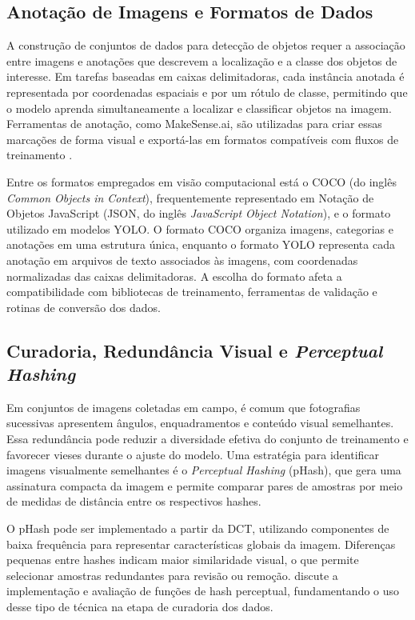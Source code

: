 \documentclass[artigo,times,capa]{iftex2024}
\begin{document}
\subsection{Anotação de Imagens e Formatos de Dados}

A construção de conjuntos de dados para detecção de objetos requer a associação entre imagens e anotações que descrevem a localização e a classe dos objetos de interesse. Em tarefas baseadas em caixas delimitadoras, cada instância anotada é representada por coordenadas espaciais e por um rótulo de classe, permitindo que o modelo aprenda simultaneamente a localizar e classificar objetos na imagem. Ferramentas de anotação, como MakeSense.ai, são utilizadas para criar essas marcações de forma visual e exportá-las em formatos compatíveis com fluxos de treinamento \cite{Makesense2024}.

Entre os formatos empregados em visão computacional está o COCO (do inglês \textit{Common Objects in Context}), frequentemente representado em Notação de Objetos JavaScript (JSON, do inglês \textit{JavaScript Object Notation}), e o formato utilizado em modelos \ac{YOLO}. O formato \ac{COCO} organiza imagens, categorias e anotações em uma estrutura única, enquanto o formato \ac{YOLO} representa cada anotação em arquivos de texto associados às imagens, com coordenadas normalizadas das caixas delimitadoras. A escolha do formato afeta a compatibilidade com bibliotecas de treinamento, ferramentas de validação e rotinas de conversão dos dados.

\subsection{Curadoria, Redundância Visual e \textit{Perceptual Hashing}}

Em conjuntos de imagens coletadas em campo, é comum que fotografias sucessivas apresentem ângulos, enquadramentos e conteúdo visual semelhantes. Essa redundância pode reduzir a diversidade efetiva do conjunto de treinamento e favorecer vieses durante o ajuste do modelo. Uma estratégia para identificar imagens visualmente semelhantes é o \textit{Perceptual Hashing} (pHash), que gera uma assinatura compacta da imagem e permite comparar pares de amostras por meio de medidas de distância entre os respectivos hashes.

O pHash pode ser implementado a partir da \ac{DCT}, utilizando componentes de baixa frequência para representar características globais da imagem. Diferenças pequenas entre hashes indicam maior similaridade visual, o que permite selecionar amostras redundantes para revisão ou remoção. \textcite{Zauner2010ImplementationAB} discute a implementação e avaliação de funções de hash perceptual, fundamentando o uso desse tipo de técnica na etapa de curadoria dos dados.
\end{document}
